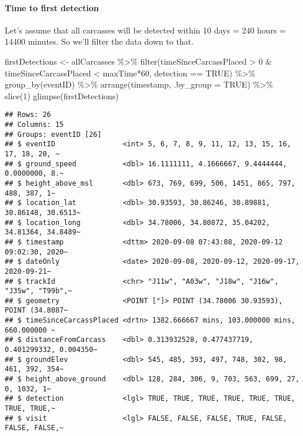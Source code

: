 \documentclass[
]{article}
\newenvironment{Shaded}{\begin{snugshade}}{\end{snugshade}}
\newcommand{\AttributeTok}[1]{\textcolor[rgb]{0.77,0.63,0.00}{#1}}
\newcommand{\ConstantTok}[1]{\textcolor[rgb]{0.00,0.00,0.00}{#1}}
\newcommand{\DecValTok}[1]{\textcolor[rgb]{0.00,0.00,0.81}{#1}}
\newcommand{\FunctionTok}[1]{\textcolor[rgb]{0.00,0.00,0.00}{#1}}
\newcommand{\NormalTok}[1]{#1}
\newcommand{\OtherTok}[1]{\textcolor[rgb]{0.56,0.35,0.01}{#1}}
\newcommand{\SpecialCharTok}[1]{\textcolor[rgb]{0.00,0.00,0.00}{#1}}
\begin{document}
\hypertarget{time-to-first-detection}{%
\paragraph{Time to first detection}\label{time-to-first-detection}}

Let's assume that all carcasses will be detected within 10 days = 240
hours = 14400 minutes. So we'll filter the data down to that.

\begin{Shaded}
\begin{Highlighting}[]
\NormalTok{firstDetections }\OtherTok{\textless{}{-}}\NormalTok{ allCarcasses }\SpecialCharTok{\%\textgreater{}\%}
  \FunctionTok{filter}\NormalTok{(timeSinceCarcassPlaced }\SpecialCharTok{\textgreater{}} \DecValTok{0} \SpecialCharTok{\&}\NormalTok{ timeSinceCarcassPlaced }\SpecialCharTok{\textless{}}\NormalTok{ maxTime}\SpecialCharTok{*}\DecValTok{60}\NormalTok{, detection }\SpecialCharTok{==} \ConstantTok{TRUE}\NormalTok{) }\SpecialCharTok{\%\textgreater{}\%}
  \FunctionTok{group\_by}\NormalTok{(eventID) }\SpecialCharTok{\%\textgreater{}\%}
  \FunctionTok{arrange}\NormalTok{(timestamp, }\AttributeTok{.by\_group =} \ConstantTok{TRUE}\NormalTok{) }\SpecialCharTok{\%\textgreater{}\%}
  \FunctionTok{slice}\NormalTok{(}\DecValTok{1}\NormalTok{)}
\FunctionTok{glimpse}\NormalTok{(firstDetections)}
\end{Highlighting}
\end{Shaded}

\begin{verbatim}
## Rows: 26
## Columns: 15
## Groups: eventID [26]
## $ eventID                <int> 5, 6, 7, 8, 9, 11, 12, 13, 15, 16, 17, 18, 20, ~
## $ ground_speed           <dbl> 16.1111111, 4.1666667, 9.4444444, 0.0000000, 8.~
## $ height_above_msl       <dbl> 673, 769, 699, 506, 1451, 865, 797, 488, 387, 1~
## $ location_lat           <dbl> 30.93593, 30.86246, 30.89881, 30.86148, 30.6513~
## $ location_long          <dbl> 34.78006, 34.80872, 35.04202, 34.81364, 34.8489~
## $ timestamp              <dttm> 2020-09-08 07:43:08, 2020-09-12 09:02:30, 2020~
## $ dateOnly               <date> 2020-09-08, 2020-09-12, 2020-09-17, 2020-09-21~
## $ trackId                <chr> "J11w", "A03w", "J18w", "J16w", "J35w", "T99b",~
## $ geometry               <POINT [°]> POINT (34.78006 30.93593), POINT (34.8087~
## $ timeSinceCarcassPlaced <drtn> 1382.666667 mins, 103.000000 mins, 660.000000 ~
## $ distanceFromCarcass    <dbl> 0.313932528, 0.477437719, 0.401299332, 0.004350~
## $ groundElev             <dbl> 545, 485, 393, 497, 748, 302, 98, 461, 392, 354~
## $ height_above_ground    <dbl> 128, 284, 306, 9, 703, 563, 699, 27, 0, 1032, 1~
## $ detection              <lgl> TRUE, TRUE, TRUE, TRUE, TRUE, TRUE, TRUE, TRUE,~
## $ visit                  <lgl> FALSE, FALSE, FALSE, TRUE, FALSE, FALSE, FALSE,~
\end{verbatim}
\end{document}
